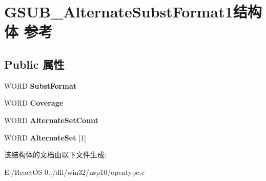 \hypertarget{struct_g_s_u_b___alternate_subst_format1}{}\section{G\+S\+U\+B\+\_\+\+Alternate\+Subst\+Format1结构体 参考}
\label{struct_g_s_u_b___alternate_subst_format1}
\subsection*{Public 属性}
\begin{DoxyCompactItemize}
\item 
\mbox{\label{struct_g_s_u_b___alternate_subst_format1_a9f28bc7f05ced831aab5d551f7fc1016}} 
W\+O\+RD {\bfseries Subst\+Format}
\item 
\mbox{\label{struct_g_s_u_b___alternate_subst_format1_a29ccde440829b27b6236d0f6daf2b8e5}} 
W\+O\+RD {\bfseries Coverage}
\item 
\mbox{\label{struct_g_s_u_b___alternate_subst_format1_a2e66975d69ae1af8c0ce2ad051e33b80}} 
W\+O\+RD {\bfseries Alternate\+Set\+Count}
\item 
\mbox{\label{struct_g_s_u_b___alternate_subst_format1_a89c7447e37af945f99fa16c74fd7685b}} 
W\+O\+RD {\bfseries Alternate\+Set} \mbox{[}1\mbox{]}
\end{DoxyCompactItemize}


该结构体的文档由以下文件生成\+:\begin{DoxyCompactItemize}
\item 
E\+:/\+React\+O\+S-\/0../dll/win32/usp10/opentype.\+c\end{DoxyCompactItemize}
